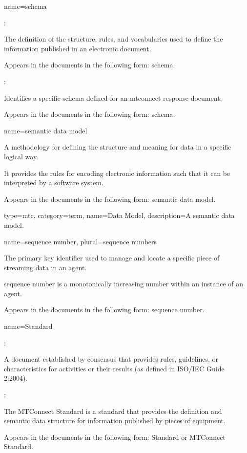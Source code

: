 {
  name={schema}
}
{
	:

	The definition of the structure, rules, and vocabularies used to define the information published in an electronic document.

	Appears in the documents in the following form: schema.

	:

	Identifies a specific schema defined for an \gls{mtconnect response document}.

	Appears in the documents in the following form: \gls{schema}.
}


{
  name={semantic data model}
}
{
	A methodology for defining the structure and meaning for data in a specific logical way.  

	It provides the rules for encoding electronic information such that it can be interpreted by a software system.  

	Appears in the documents in the following form: \gls{semantic data model}.
}

{
  type=mtc,
  category=term,
  name={Data Model},
  description={A \gls{semantic data model}.}
}

{
  name={sequence number},
  plural={sequence numbers}
}
{
	The primary key identifier used to manage and locate a specific piece of \gls{streaming data} in an \gls{agent}.

	\gls{sequence number} is a monotonically increasing number within an instance of an \gls{agent}.

	Appears in the documents in the following form: \gls{sequence number}.
}


{
  name={Standard}
}
{
	:

	A document established by consensus that provides rules, guidelines, or characteristics for activities or their results (as defined in ISO/IEC Guide 2:2004).

	: 

	The MTConnect Standard is a standard that provides the definition and semantic data structure for information published by pieces of equipment.

	Appears in the documents in the following form: Standard or MTConnect Standard.
}


